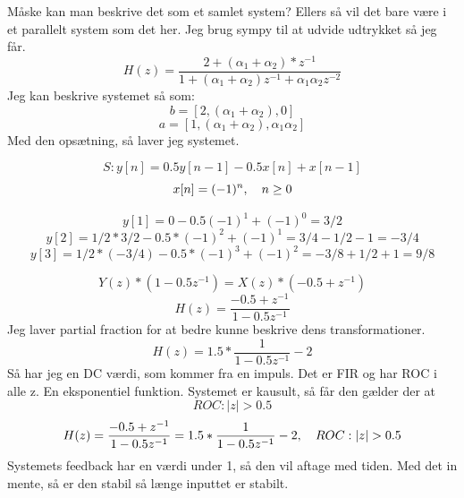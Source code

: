 \begin{EksamensOpgaver}
\begin{Eksamenssæt}
\begin{eksamensOpgave}
\begin{UnderOpgave}
                
            \end{UnderOpgave}
            \begin{UnderOpgave}
                Måske kan man beskrive det som et samlet system? 
                Ellers så vil det bare være i et parallelt system som det her. 
                Jeg brug sympy til at udvide udtrykket så jeg får.
                \[H(z) = \frac{2 + (\alpha_1 + \alpha_2)* z^{-1}}{1 + (\alpha_1 + \alpha_2)z^{-1} + \alpha_1\alpha_2 z^{-2}}\]
                Jeg kan beskrive systemet så som: 
                \[b = [2, (\alpha_1 + \alpha_2), 0]\]
                \[a = [1, (\alpha_1 + \alpha_2), \alpha_1\alpha_2]\]
                Med den opsætning, så laver jeg systemet. 
                \vspace{100pt}       
            \end{UnderOpgave}
        \end{eksamensOpgave}
        \begin{eksamensOpgave}
            \[S: y[n] = 0.5y[n - 1] - 0.5x[n] + x[n - 1]\]
            \[x[n] = (-1)^n, \tab{0} n \geq 0\]
            \begin{UnderOpgave}[Beregn y1, y2 og y3]
                \[y[1] = 0 - 0.5(-1)^1 + (-1)^0 = 3/2\]
                \[y[2] = 1/2 * 3/2 - 0.5 * (-1)^2 + (-1)^1 = 3/4 - 1/2 - 1 = -3/4\]        
                \[y[3] = 1/2*(-3/4) - 0.5 * (-1)^3 + (-1)^2 = -3/8 + 1/2 + 1 = 9/8\]
            \end{UnderOpgave}
            \begin{UnderOpgave}
                \[Y(z)*(1 - 0.5z^{-1}) = X(z)*(-0.5 + z^{-1})\]
                \[H(z) = \frac{-0.5 + z^{-1}}{1 - 0.5z^{-1}}\]
                Jeg laver partial fraction for at bedre kunne beskrive dens transformationer.
                \[H(z) = 1.5 * \frac{1}{1 - 0.5z^{-1}} - 2\]
                Så har jeg en DC værdi, som kommer fra en impuls. Det er FIR og har ROC i alle z. 
                En eksponentiel funktion. Systemet er kausult, så får den gælder der at 
                \[ROC: |z| > 0.5\]
                \[H(z) = \frac{-0.5 + z^{-1}}{1 - 0.5z^{-1}} = 1.5 * \frac{1}{1 - 0.5z^{-1}} - 2, \tab{0} ROC: |z| > 0.5\]
                Systemets feedback har en værdi under 1, så den vil aftage med tiden. Med det in mente, så er den stabil så længe inputtet er stabilt. 


\end{UnderOpgave}
\end{eksamensOpgave}
\end{Eksamenssæt}
\end{EksamensOpgaver}
